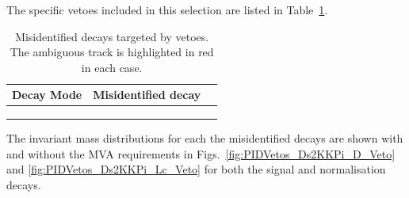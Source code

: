 The specific vetoes included in this selection are listed in Table~\ref{table:pidvetos}. 
\begin{table}[!ht]
\begin{center}
\begin{tabular}{ l l l }
\hline
Decay Mode & Misidentified decay\\
\hline
\decay{\Dsp}{{\color{Red}\Kp}\Km\pip}   & \decay{\Dp}{{\color{Red}\pip}\Km\pip}    \\
                           & \decay{\Lc}{{\color{Red}\Pp}\Km\pip}     \\
\hline
\decay{\Dsp}{{\color{Red}\Kp}\pim\pip}  & \decay{\Dp}{{\color{Red}\pip}\pim\pip}   \\

\hline
\end{tabular}
\caption{Misidentified decays targeted by vetoes. The ambiguous track is highlighted in red in each case.}
\label{table:pidvetos}
\end{center}
\end{table}
The invariant mass distributions for each the misidentified \decay{\Dsp}{\Kp\Km\pip} decays are shown with and without the MVA requirements in Figs.~\ref{fig:PIDVetos_Ds2KKPi_D_Veto} and \ref{fig:PIDVetos_Ds2KKPi_Lc_Veto} for both the signal \decay{\Bp}{\Dsp\phiz} and normalisation \decay{\Bp}{\Dsp\Dzb} decays.



